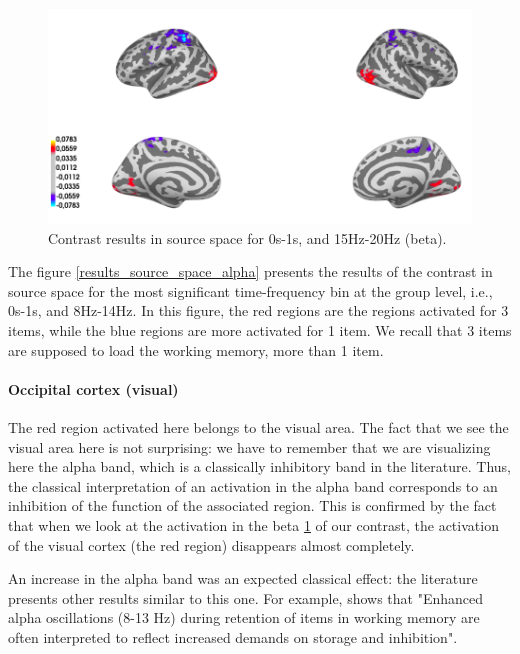 \begin{figure}[ht]
    \centering
    \includegraphics[width=13cm]{images_report/source/source_results_beta_1s.png}
    \caption[Contrast results in the source space (beta)]%
    {Contrast results in source space for 0s-1s, and 15Hz-20Hz (beta).}
    \label{results_source_space_beta}
\end{figure}

The figure \ref{results_source_space_alpha} presents the results of the contrast in source space for the most significant time-frequency bin at the group level, i.e., 0s-1s, and 8Hz-14Hz. In this figure, the red regions are the regions activated for 3 items, while the blue regions are more activated for 1 item. We recall that 3 items are supposed to load the working memory, more than 1 item.

\paragraph{Occipital cortex (visual)}
\label{section:alpha_discussion}
The red region activated here belongs to the visual area. The fact that we see the visual area here is not surprising: we have to remember that we are visualizing here the alpha band, which is a classically inhibitory band in the literature. Thus, the classical interpretation of an activation in the alpha band corresponds to an inhibition of the function of the associated region. This is confirmed by the fact that when we look at the activation in the beta \ref{results_source_space_beta} of our contrast, the activation of the visual cortex (the red region) disappears almost completely.

An increase in the alpha band was an expected classical effect: the literature presents other results similar to this one. For example, \cite{obleser2012adverse} shows that "Enhanced alpha oscillations (8-13 Hz) during retention of items in working memory are often interpreted to reflect increased demands on storage and inhibition".

